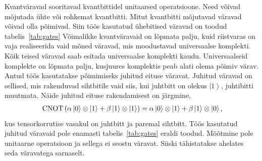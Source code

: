 \documentclass[12pt]{report}
\def\paren#1{\left(#1\right)}
\def\ket#1{\left|#1\right>}
\def\CNOT{\mathop{\rm CNOT}\nolimits}
\begin{document}
Kvantväravad sooritavad kvantbittidel unitaarsed operatsioone.
Need võivad mõjutada ühte või rohkemat kvantbitti.
Mitut kvantbitti mõjutavad väravad võivad olla põimivad.
Siin töös kasutatud ühebitised väravad on toodud tabelis~\ref{tab:gates}
Võimalikke kvantväravaid on lõpmata palju, kuid riistvaras on vaja realiseerida vaid mõned väravad, mis moodustavad universaalse komplekti.
Kõik teised väravad saab esitada universaalse komplekti kaudu.
Universaalseid komplekte on lõpmata palju, kusjuures komplektis peab alati olema põimiv värav.
Antud töös kasutatakse põimimiseks juhitud eituse väravat.
Juhitud väravad on sellised, mis rakenduvad sihtbitile vaid siis, kui juhtbitt on olekus \(\ket1\), juhtibitti muutmata.
Näide juhitud eituse rakendamisest on järgmine,
\begin{align}
    \CNOT \paren{\alpha \ket{0} \otimes \ket{1} + \beta \ket{1} \otimes \ket{1}}
    = \alpha \ket{0} \otimes \ket{1} + \beta \ket{1} \otimes \ket{0} \rlap{,}
\end{align}
kus tensorkorrutise vasakul on juhtbitt ja paremal sihtbitt.
Töös kasutatud juhitud väravaid pole enamasti tabelis~\ref{tab:gates} eraldi toodud.
Mõõtmine pole unitaarne operatsioon ja sellega ei seostu väravat.
Siiski tähistatakse ahelates seda väravatega sarnaselt.
\end{document}
